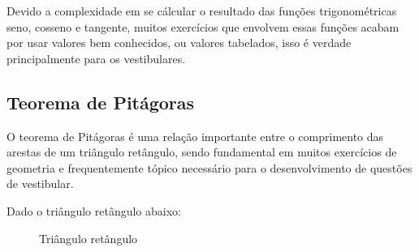\begin{multicols*}{2}
    Devido a complexidade em se cálcular o resultado das funções trigonométricas
    seno, cosseno e tangente, muitos exercícios que envolvem essas funções acabam
    por usar valores bem conhecidos, ou valores tabelados, isso é verdade
    principalmente para os vestibulares.

    \begin{table}[H]
        \renewcommand\arraystretch{2.5}
        \centering
        \caption{Tabela seno, cosseno e tangente}
        \label{tab:trig_val}
    \end{table}
 
    \subsection{Teorema de Pitágoras}
    
    O teorema de Pitágoras é uma relação importante entre o comprimento das arestas 
    de um triângulo retângulo, sendo fundamental em muitos exercícios de geometria
    e frequentemente tópico necessário para o desenvolvimento de questões de 
    vestibular.

    \noindent
    Dado o triângulo retângulo abaixo:
    \begin{figure}[H]
        \centering
        \caption{Triângulo retângulo}
        \label{fig:tri_abc}
    \end{figure}


\end{multicols*}
